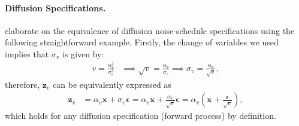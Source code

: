 \paragraph{Diffusion Specifications.} \cite{kingma2021variational} elaborate on the equivalence of diffusion noise-schedule specifications using the following straightforward example. Firstly, the change of variables we used implies that $\sigma_v$ is given by:
%
\begin{align}
    v = \frac{\alpha^2_v}{\sigma^2_v} &\implies \sqrt{v} = \frac{\alpha_v}{\sigma_v} \implies \sigma_v = \frac{\alpha_v}{\sqrt{v}},
\end{align}
%
therefore, $\mathbf{z}_v$ can be equivalently expressed as
%
\begin{align}
    \mathbf{z}_v & = \alpha_v \mathbf{x} + \sigma_v \boldsymbol{\epsilon} 
    = \alpha_v \mathbf{x} + \frac{\alpha_v}{\sqrt{v}} \boldsymbol{\epsilon} 
    = \alpha_v \left( \mathbf{x} + \frac{\boldsymbol{\epsilon}}{\sqrt{v}}\right), 
    \label{eq: equivv}
\end{align}
%
which holds for any diffusion specification (forward process) by definition.

